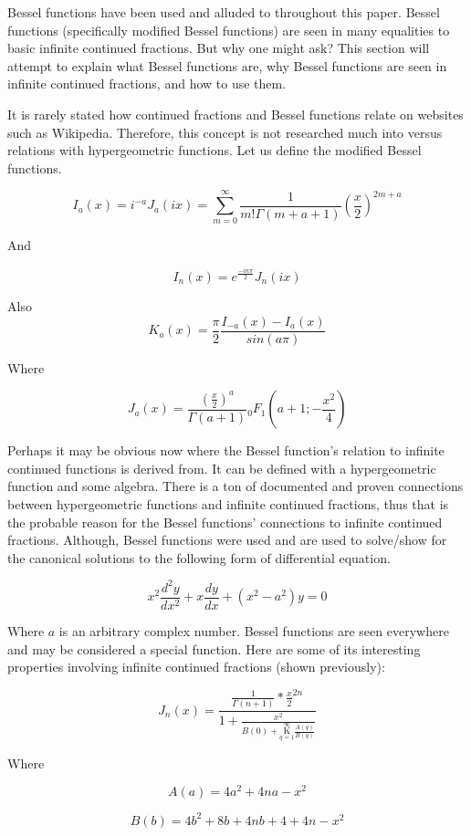 \documentclass{article}
\begin{document}
Bessel functions have been used and alluded to throughout this paper. Bessel functions (specifically modified Bessel functions) are seen in many equalities to basic infinite continued fractions. But why one might ask? This section will attempt to explain what Bessel functions are, why Bessel functions are seen in infinite continued fractions, and how to use them. 
$${} $$

It is rarely stated how continued fractions and Bessel functions relate on websites such as Wikipedia. Therefore, this concept is not researched much into versus relations with hypergeometric functions. Let us define the modified Bessel functions.

$$I_a(x) = i^{-a} J_a(ix) = \underset{m=0}{\overset{\infty}{\sum}} \frac{1}{m!\Gamma(m+a+1)}(\frac{x}{2})^{2m+a}$$

And

$$I_n(x)=e^\frac{-i n \pi}{2} J_n(ix)$$

Also $$K_a(x) = \frac{\pi}{2} \frac{I_{-a}(x)-I_{a}(x)}{sin(a\pi)}$$

Where

$$J_a(x) = \frac{(\frac{x}{2})^{a}}{\Gamma(a+1)} {}_0 F_1(a+1;-\frac{x^2}{4})$$

Perhaps it may be obvious now where the Bessel function’s relation to infinite continued functions is derived from. It can be defined with a hypergeometric function and some algebra. There is a ton of documented and proven connections between hypergeometric functions and infinite continued fractions, thus that is the probable reason for the Bessel functions’ connections to infinite continued fractions. Although, Bessel functions were used and are used to solve/show for the canonical solutions to the following form of differential equation.

$$x^2 \frac{d^2y}{dx^2} + x\frac{dy}{dx} + (x^2-a^2)y = 0$$

Where $a$ is an arbitrary complex number. Bessel functions are seen everywhere and may be considered a special function. Here are some of its interesting properties involving infinite continued fractions (shown previously):

$$J_n(x)=\frac{\frac{1}{\Gamma(n+1)}*\frac{x}{2}^{2n}}{1+\frac{x^2}{B(0)+ \underset{q=1}{\overset{\infty}{ \mathrm K}} \frac{A(q)}{B(q)}}}$$

Where

$$ A(a) = 4a^2 + 4na - x^2$$

$$ B(b) = 4b^2 + 8b + 4nb + 4 + 4n - x^2$$
\end{document}

